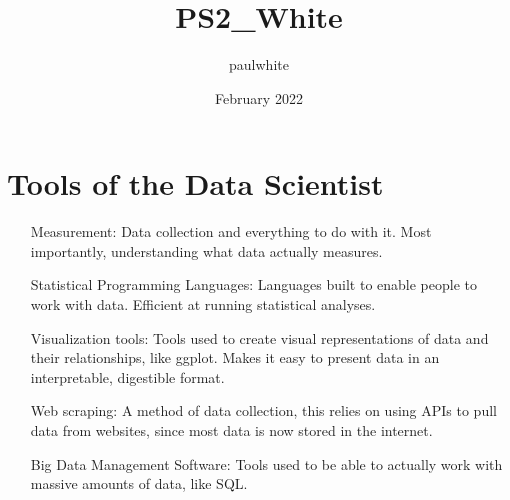 \documentclass{article}
\title{PS2_White}
\author{paulwhite }
\date{February 2022}
\begin{document}
\section{Tools of the Data Scientist}

\begin{itemize}
    \item[Measurement:] Data collection and everything to do with it. Most importantly, understanding what data actually measures.
    \item[Statistical Programming Languages:] Languages built to enable people to work with data. Efficient at running statistical analyses.
    \item[Visualization tools:] Tools used to create visual representations of data and their relationships, like ggplot. Makes it easy to present data in an interpretable, digestible format.
    \item[Web scraping:] A method of data collection, this relies on using APIs to pull data from websites, since most data is now stored in the internet.
    \item[Big Data Management Software:] Tools used to be able to actually work with massive amounts of data, like SQL.
    
\end{itemize}
\end{document}
